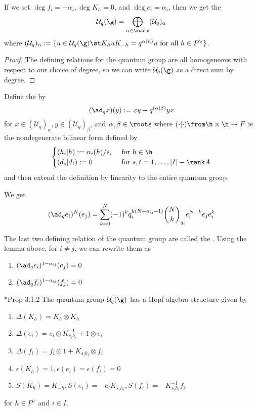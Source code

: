 \documentclass[11pt,leqno,oneside]{amsart}
\numberwithin{thm}{section}
\newcommand{\weightlattice}{P}
\newcommand{\U}{\mathcal{U}}
\newcommand{\qbinom}[3][q]{\binom{#2}{#3}_{#1}}
\begin{document}
\begin{prop}\label{root-space-decomp}
  If we set \(\deg f_i = -\alpha_i, \deg K_h = 0\), and \(\deg e_i =
  \alpha_i\), then we get the  \[
    \U_q(\g) = \bigoplus_{\alpha \in \roots} (\U_q)_{\alpha}
  \]
  where \((\U_q)_\alpha := \{u \in \U_q(\g) \st K_h u K_{-h} =
  q^{\alpha(h)}u \text{ for all } h \in \weightlattice^\vee\}\).
\end{prop}
\begin{proof}
  The defining relations for the quantum group are all homogeneous
  with respect to our choice of degree, so we can write \(\U_q(\g)\)
  as a direct sum by degree.
\end{proof}
\begin{defn}
  Define the  by \[
    (\ad_q x)(y) := xy - q^{(\alpha | \beta)}yx
  \]
  for \(x \in (\U_q)_\alpha, y \in (\U_q)_\beta\), and \(\alpha,\beta
  \in \roots\) where \((\cdot | \cdot) \from \h \times \h \to F\) is
  the nondegenerate bilinear form
  defined by \[
    \begin{cases}
      (h_i | h) := \alpha_i(h)/s_i & \text{ for }h\in \h\\
      (d_s | d_t) := 0 & \text{ for }s,t = 1,\ldots,|I|-\rank A
    \end{cases}
  \]
  and then extend the definition by linearity to the entire quantum group. 
\end{defn}
\begin{lem}
  We get \[
    (\ad_q e_i)^N(e_j) = \sum_{k=0}^N (-1)^k q_i^{k(N+a_{ij}-1)}
    \qbinom[q_i]{N}{k} e_i^{N-k} e_j e_i^k
  \]
\end{lem}
\begin{rmk}
  The last two defining relation of the quantum group are called the
  . Using the lemma above, for \(i \neq
  j\), we can rewrite
  them as
  \begin{enumerate}
  \item \((\ad_q e_i)^{1-a_{ij}}(e_j) = 0\)
  \item \((\ad_q f_i)^{1-a_{ij}}(f_j) = 0\)
  \end{enumerate}
\end{rmk}
\begin{prop}
  \cite{hong-kang}*{Prop 3.1.2} The quantum group \(\U_q(\g)\) has a
  Hopf algebra structure given by
  \begin{enumerate}
  \item \(\Delta(K_h) = K_h \otimes K_h\)
  \item \(\Delta(e_i) = e_i \otimes K_{s_i h_i}^{-1} + 1 \otimes e_i\)
  \item \(\Delta(f_i) = f_i \otimes 1 + K_{s_i h_i} \otimes f_i\)
  \item \(\epsilon(K_h) = 1, \epsilon(e_i) = \epsilon(f_i) = 0\)
  \item \(S(K_h) = K_{-h}, S(e_i) = - e_i K_{s_i h_i}, S(f_i) = -
    K_{s_i h_i}^{-1} f_i\)
  \end{enumerate}
  for \(h \in \weightlattice^\vee\) and \(i \in I\).
\end{prop}
\end{document}
